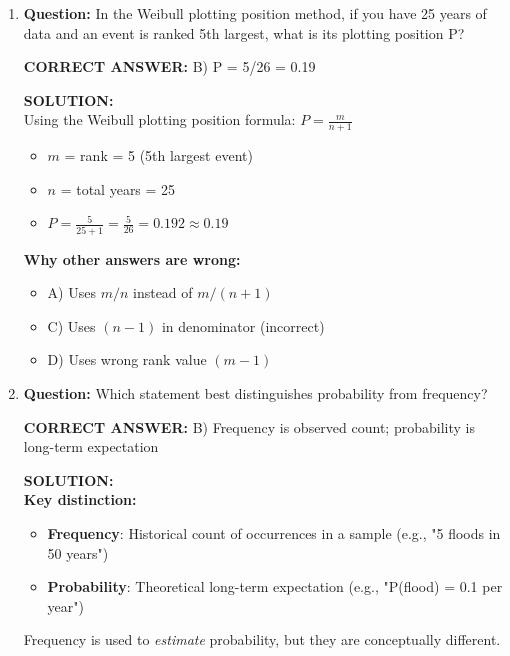 \documentclass[11pt,a4paper]{article}
\newenvironment{correctanswer}
    {\color{correct}\textbf{CORRECT ANSWER: }}
    {}
\newenvironment{solutionbox}
    {\color{solution}\begin{framed}\textbf{SOLUTION:}\\\vspace{0.2cm}}
    {\end{framed}}
\begin{document}
\begin{enumerate}

\item \textbf{Question:} In the Weibull plotting position method, if you have 25 years of data and an event is ranked 5th largest, what is its plotting position P?

\begin{correctanswer}
B) P = 5/26 = 0.19
\end{correctanswer}

\begin{solutionbox}
Using the Weibull plotting position formula: $P = \frac{m}{n+1}$
\begin{itemize}[nosep]
    \item $m$ = rank = 5 (5th largest event)
    \item $n$ = total years = 25
    \item $P = \frac{5}{25+1} = \frac{5}{26} = 0.192 \approx 0.19$
\end{itemize}
\textbf{Why other answers are wrong:}
\begin{itemize}[nosep]
    \item A) Uses $m/n$ instead of $m/(n+1)$
    \item C) Uses $(n-1)$ in denominator (incorrect)
    \item D) Uses wrong rank value $(m-1)$
\end{itemize}
\end{solutionbox}

\item \textbf{Question:} Which statement best distinguishes probability from frequency?

\begin{correctanswer}
B) Frequency is observed count; probability is long-term expectation
\end{correctanswer}

\begin{solutionbox}
\textbf{Key distinction:}
\begin{itemize}[nosep]
    \item \textbf{Frequency}: Historical count of occurrences in a sample (e.g., "5 floods in 50 years")
    \item \textbf{Probability}: Theoretical long-term expectation (e.g., "P(flood) = 0.1 per year")
\end{itemize}
Frequency is used to \emph{estimate} probability, but they are conceptually different.
\end{solutionbox}


\end{enumerate}
\end{document}
